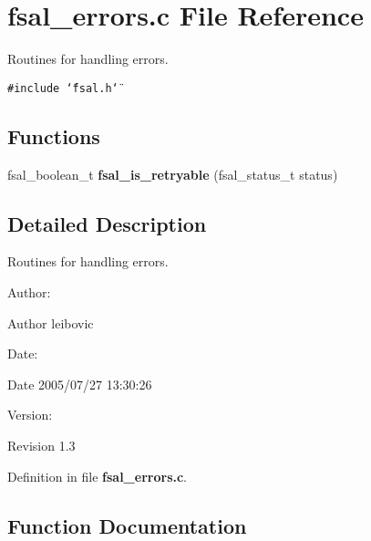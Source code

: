 \section{fsal\_\-errors.c File Reference}
\label{fsal__errors_8c}
Routines for handling errors. 

{\tt \#include \char`\"{}fsal.h\char`\"{}}\par
\subsection*{Functions}
\begin{CompactItemize}
\item 
fsal\_\-boolean\_\-t {\bf fsal\_\-is\_\-retryable} (fsal\_\-status\_\-t status)
\end{CompactItemize}


\subsection{Detailed Description}
Routines for handling errors. 

\begin{Desc}
\item[Author:]\begin{Desc}
\item[Author]leibovic \end{Desc}
\end{Desc}
\begin{Desc}
\item[Date:]\begin{Desc}
\item[Date]2005/07/27 13:30:26 \end{Desc}
\end{Desc}
\begin{Desc}
\item[Version:]\begin{Desc}
\item[Revision]1.3 \end{Desc}
\end{Desc}


Definition in file {\bf fsal\_\-errors.c}.

\subsection{Function Documentation}
